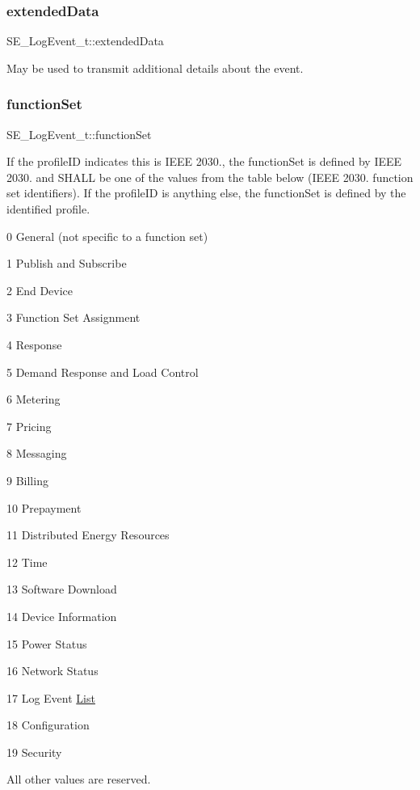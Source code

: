 \subsubsection{\texorpdfstring{extended\+Data}{extendedData}}
{\footnotesize\ttfamily S\+E\+\_\+\+Log\+Event\+\_\+t\+::extended\+Data}

May be used to transmit additional details about the event. \mbox{\label{group__LogEvent_gae3dd072a18ca3eab7d466064a072a2ed}} 
\subsubsection{\texorpdfstring{function\+Set}{functionSet}}
{\footnotesize\ttfamily S\+E\+\_\+\+Log\+Event\+\_\+t\+::function\+Set}

If the profile\+ID indicates this is I\+E\+EE 2030., the function\+Set is defined by I\+E\+EE 2030. and S\+H\+A\+LL be one of the values from the table below (I\+E\+EE 2030. function set identifiers). If the profile\+ID is anything else, the function\+Set is defined by the identified profile.

0 General (not specific to a function set)

1 Publish and Subscribe

2 End Device

3 Function Set Assignment

4 Response

5 Demand Response and Load Control

6 Metering

7 Pricing

8 Messaging

9 Billing

10 Prepayment

11 Distributed Energy Resources

12 Time

13 Software Download

14 Device Information

15 Power Status

16 Network Status

17 Log Event \hyperlink{structList}{List}

18 Configuration

19 Security

All other values are reserved. \mbox{\label{group__LogEvent_ga7a77c2d8bf99665d52ad8a077c62892b}} 
